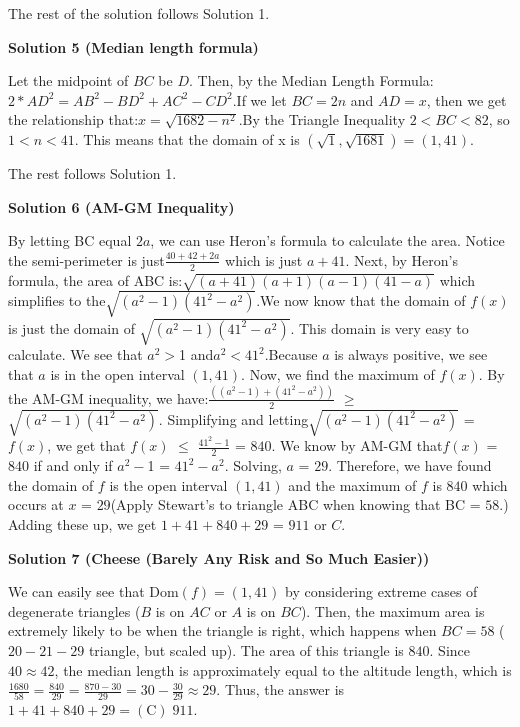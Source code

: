 \begin{enumerate}
 
The rest of the solution follows Solution 1.

 


 



\textbf{Solution 5 (Median length formula)}

Let the midpoint of $BC$ be $D$. Then, by the Median Length Formula:$2*AD^2 = AB^2 - BD^2 + AC^2 - CD^2$.If we let $BC = 2n$ and $AD = x$, then we get the relationship that:$x = \sqrt{1682-n^2}$.By the Triangle Inequality $2 < BC < 82$, so $1 < n < 41$. This means that the domain of x is $(\sqrt{1}, \sqrt{1681}) = (1, 41)$.

 The rest follows Solution 1.

 


 



\textbf{Solution 6 (AM-GM Inequality)}

By letting BC equal ${2a}$, we can use Heron's formula to calculate the area. Notice the semi-perimeter is just$\frac{40 + 42 + 2a}{2}$ which is just ${a + 41}$. Next, by Heron's formula, the area of ABC is:$\sqrt{(a + 41)(a + 1)(a - 1)(41 - a)}$ which simplifies to the$\sqrt{(a^2 - 1)(41^2 - a^2)}$.We now know that the domain of ${f(x)}$ is just the domain of $\sqrt{(a^2 - 1)(41^2 - a^2)}$. This domain is very easy to calculate. We see that $a^{2} >$1 and$a^{2} <$$41^{2}$.Because ${a}$ is always positive, we see that ${a}$ is in the open interval ${(1, 41)}$. Now, we find the maximum of ${f(x)}$. By the AM-GM inequality, we have:$\frac{((a^2 - 1) + (41^2 - a^2))}{2}$ $\geq$ $\sqrt{(a^2 - 1)(41^2 - a^2)}$. Simplifying and letting$\sqrt{(a^2 - 1)(41^2 - a^2)}$ = ${f(x)}$, we get that ${f(x)}$ $\leq$ $\frac{41^2 - 1}{2}$ = ${840}$. We know by AM-GM that${f(x)}$ = ${840}$ if and only if $a^{2} -$1 = $41^{2}  -$$a^{2}$. Solving, ${a}$ = ${29}$. Therefore, we have found the domain of ${f}$ is the open interval ${(1, 41)}$ and the maximum of ${f}$ is ${840}$ which occurs at ${x}$ = ${29}$(Apply Stewart's to triangle ABC when knowing that BC = ${58}$.) Adding these up, we get ${1 + 41 + 840 + 29}$ = ${911}$ or $\boxed{C}$.

 



\textbf{Solution 7 (Cheese (Barely Any Risk and So Much Easier))}

We can easily see that $\text{Dom}(f)=(1, 41)$ by considering extreme cases of degenerate triangles ($B$ is on $AC$ or $A$ is on $BC$). Then, the maximum area is extremely likely to be when the triangle is right, which happens when $BC=58$ ($20-21-29$ triangle, but scaled up). The area of this triangle is $840$. Since $40 \approx 42$, the median length is approximately equal to the altitude length, which is $\frac{1680}{58}=\frac{840}{29}=\frac{870-30}{29}=30-\frac{30}{29} \approx 29$. Thus, the answer is $1+41+840+29= \boxed{(\text{C}) \; 911}$.


\end{enumerate}
